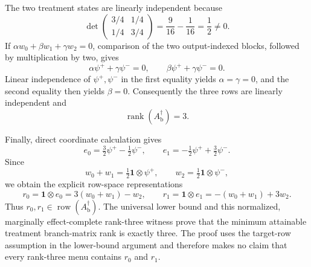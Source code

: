 The two treatment states are linearly independent because
\[
\det\begin{pmatrix}
3/4&1/4\\
1/4&3/4
\end{pmatrix}
=\frac{9}{16}-\frac{1}{16}
=\frac12
\neq0.
\]
If \(\alpha w_0+\beta w_1+\gamma w_2=0\), comparison of the two
output-indexed blocks, followed by multiplication by two, gives
\[
\alpha\psi^{+}+\gamma\psi^{-}=0,
\qquad
\beta\psi^{+}+\gamma\psi^{-}=0.
\]
Linear independence of \(\psi^{+},\psi^{-}\) in the first equality yields
\(\alpha=\gamma=0\), and the second equality then yields \(\beta=0\).
Consequently the three rows are linearly independent and
\[
\operatorname{rank}(A_{\mathrm b}^{\dagger})=3.
\]

Finally, direct coordinate calculation gives
\[
e_0=\tfrac32\psi^{+}-\tfrac12\psi^{-},
\qquad
e_1=-\tfrac12\psi^{+}+\tfrac32\psi^{-}.
\]
Since
\[
w_0+w_1=\tfrac12\mathbf 1\otimes\psi^{+},
\qquad
w_2=\tfrac12\mathbf 1\otimes\psi^{-},
\]
we obtain the explicit row-space representations
\[
r_0=\mathbf 1\otimes e_0=3(w_0+w_1)-w_2,
\qquad
r_1=\mathbf 1\otimes e_1=-(w_0+w_1)+3w_2.
\]
Thus \(r_0,r_1\in\operatorname{row}(A_{\mathrm b}^{\dagger})\).  The
universal lower bound and this normalized, marginally effect-complete
rank-three witness prove that the minimum attainable treatment branch-matrix
rank is exactly three.  The proof uses the target-row assumption in the
lower-bound argument and therefore makes no claim that every rank-three menu
contains \(r_0\) and \(r_1\).